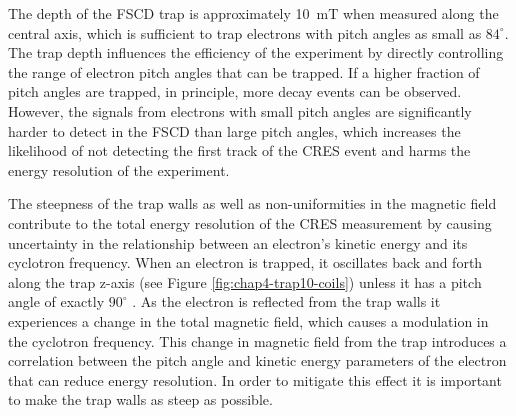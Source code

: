 \begin{table}[htbp]
\begin{minipage}{0.7\textwidth}
    \end{minipage}
    \label{fig:chap4-trap10-coils}
\end{table}

The depth of the FSCD trap is approximately 10~mT when measured along the central axis, which is sufficient to trap electrons with pitch angles as small as $84^\circ$. The trap depth influences the efficiency of the experiment by directly controlling the range of electron pitch angles that can be trapped. If a higher fraction of pitch angles are trapped, in principle, more decay events can be observed. However, the signals from electrons with small pitch angles are significantly harder to detect in the FSCD than large pitch angles, which increases the likelihood of not detecting the first track of the CRES event and harms the energy resolution of the experiment. 

The steepness of the trap walls as well as non-uniformities in the magnetic field contribute to the total energy resolution of the CRES measurement by causing uncertainty in the relationship between an electron's kinetic energy and its cyclotron frequency. When an electron is trapped, it oscillates back and forth along the trap z-axis (see Figure \ref{fig:chap4-trap10-coils}) unless it has a pitch angle of exactly $90^\circ$ \cite{p8pheno}. As the electron is reflected from the trap walls it experiences a change in the total magnetic field, which causes a modulation in the cyclotron frequency. This change in magnetic field from the trap introduces a correlation between the pitch angle and kinetic energy parameters of the electron that can reduce energy resolution. In order to mitigate this effect it is important to make the trap walls as steep as possible. 




